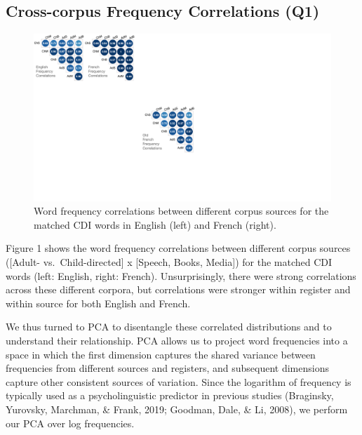 \documentclass[10pt, letterpaper]{article}
\newenvironment{CodeChunk}{}{}
\begin{document}
\hypertarget{cross-corpus-frequency-correlations-q1}{%
\subsection{Cross-corpus Frequency Correlations
(Q1)}\label{cross-corpus-frequency-correlations-q1}}

\begin{CodeChunk}
\begin{figure}[t]

{\centering \includegraphics[width=\linewidth]{figs/corpus_freq_cors_hor} 

}

\caption[Word frequency correlations between different corpus sources for the matched CDI words in English (left) and French (right)]{Word frequency correlations between different corpus sources for the matched CDI words in English (left) and French (right).}\label{fig:fig1}
\end{figure}
\end{CodeChunk}

Figure 1 shows the word frequency correlations between different corpus
sources ({[}Adult- vs.~Child-directed{]} x {[}Speech, Books, Media{]})
for the matched CDI words (left: English, right: French).
Unsurprisingly, there were strong correlations across these different
corpora, but correlations were stronger within register and within
source for both English and French.

We thus turned to PCA to disentangle these correlated distributions and
to understand their relationship. PCA allows us to project word
frequencies into a space in which the first dimension captures the
shared variance between frequencies from different sources and
registers, and subsequent dimensions capture other consistent sources of
variation. Since the logarithm of frequency is typically used as a
psycholinguistic predictor in previous studies (Braginsky, Yurovsky,
Marchman, \& Frank, 2019; Goodman, Dale, \& Li, 2008), we perform our
PCA over log frequencies.
\end{document}
